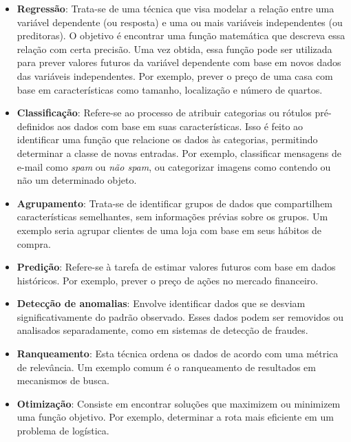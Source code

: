 \begin{itemize}
    \item \textbf{Regressão}: Trata-se de uma técnica que visa modelar a relação entre uma variável dependente (ou resposta) e uma ou mais variáveis independentes (ou preditoras). O objetivo é encontrar uma função matemática que descreva essa relação com certa precisão. Uma vez obtida, essa função pode ser utilizada para prever valores futuros da variável dependente com base em novos dados das variáveis independentes. Por exemplo, prever o preço de uma casa com base em características como tamanho, localização e número de quartos.

    \item \textbf{Classificação}: Refere-se ao processo de atribuir categorias ou rótulos pré-definidos aos dados com base em suas características. Isso é feito ao identificar uma função que relacione os dados às categorias, permitindo determinar a classe de novas entradas. Por exemplo, classificar mensagens de e-mail como \textit{spam} ou \textit{não spam}, ou categorizar imagens como contendo ou não um determinado objeto.

    \item \textbf{Agrupamento}: Trata-se de identificar grupos de dados que compartilhem características semelhantes, sem informações prévias sobre os grupos. Um exemplo seria agrupar clientes de uma loja com base em seus hábitos de compra.

    \item \textbf{Predição}: Refere-se à tarefa de estimar valores futuros com base em dados históricos. Por exemplo, prever o preço de ações no mercado financeiro.

    \item \textbf{Detecção de anomalias}: Envolve identificar dados que se desviam significativamente do padrão observado. Esses dados podem ser removidos ou analisados separadamente, como em sistemas de detecção de fraudes.

    \item \textbf{Ranqueamento}: Esta técnica ordena os dados de acordo com uma métrica de relevância. Um exemplo comum é o ranqueamento de resultados em mecanismos de busca.

    \item \textbf{Otimização}: Consiste em encontrar soluções que maximizem ou minimizem uma função objetivo. Por exemplo, determinar a rota mais eficiente em um problema de logística.
\end{itemize}


